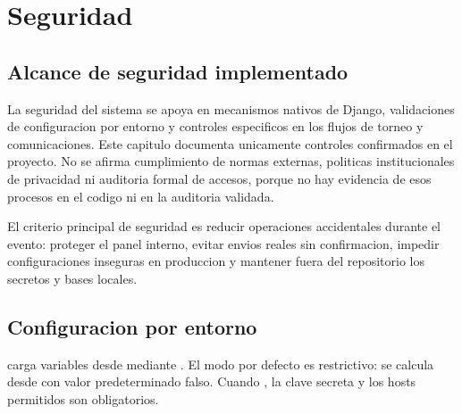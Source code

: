 \chapter{Seguridad}
\label{chap:seguridad}

\section{Alcance de seguridad implementado}
\label{sec:seguridad-alcance}

La seguridad del sistema se apoya en mecanismos nativos de Django, validaciones de configuracion por entorno y controles especificos en los flujos de torneo y comunicaciones. Este capitulo documenta unicamente controles confirmados en el proyecto. No se afirma cumplimiento de normas externas, politicas institucionales de privacidad ni auditoria formal de accesos, porque no hay evidencia de esos procesos en el codigo ni en la auditoria validada.

El criterio principal de seguridad es reducir operaciones accidentales durante el evento: proteger el panel interno, evitar envios reales sin confirmacion, impedir configuraciones inseguras en produccion y mantener fuera del repositorio los secretos y bases locales.

\section{Configuracion por entorno}
\label{sec:seguridad-configuracion}

 carga variables desde  mediante . El modo por defecto es restrictivo:  se calcula desde  con valor predeterminado falso. Cuando , la clave secreta y los hosts permitidos son obligatorios.

